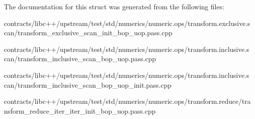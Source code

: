 The documentation for this struct was generated from the following files\+:\begin{DoxyCompactItemize}
\item 
contracts/libc++/upstream/test/std/numerics/numeric.\+ops/transform.\+exclusive.\+scan/transform\+\_\+exclusive\+\_\+scan\+\_\+init\+\_\+bop\+\_\+uop.\+pass.\+cpp\item 
contracts/libc++/upstream/test/std/numerics/numeric.\+ops/transform.\+inclusive.\+scan/transform\+\_\+inclusive\+\_\+scan\+\_\+bop\+\_\+uop.\+pass.\+cpp\item 
contracts/libc++/upstream/test/std/numerics/numeric.\+ops/transform.\+inclusive.\+scan/transform\+\_\+inclusive\+\_\+scan\+\_\+bop\+\_\+uop\+\_\+init.\+pass.\+cpp\item 
contracts/libc++/upstream/test/std/numerics/numeric.\+ops/transform.\+reduce/transform\+\_\+reduce\+\_\+iter\+\_\+iter\+\_\+init\+\_\+bop\+\_\+uop.\+pass.\+cpp\end{DoxyCompactItemize}

